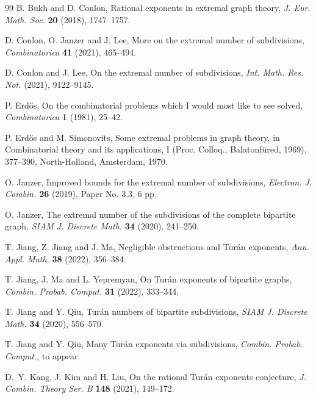 \documentclass[11pt]{article}
\numberwithin{equation}{section}
\theoremstyle{definition}
\begin{document}

\begin{thebibliography}{99}
B. Bukh and D. Conlon, Rational exponents in extremal graph theory, {\it J. Eur. Math. Soc.} {\bf 20} (2018), 1747--1757.

D. Conlon, O. Janzer and J. Lee, More on the extremal number of subdivisions, {\it Combinatorica} {\bf 41} (2021), 465--494.

D. Conlon and J. Lee, On the extremal number of subdivisions, {\it Int. Math. Res. Not.} (2021), 9122--9145.

P. Erd\H{o}s, On the combinatorial problems which I would most like to see solved, {\it Combinatorica} {\bf 1} (1981), 25--42.

P. Erd\H{o}s and M. Simonovits, Some extremal problems in graph theory, in Combinatorial theory and its applications, I (Proc. Colloq., Balatonf\"ured, 1969), 377--390, North-Holland, Amsterdam, 1970.


O. Janzer, Improved bounds for the extremal number of subdivisions, {\it Electron. J. Combin.} {\bf 26} (2019), Paper No. 3.3, 6 pp.

O. Janzer, The extremal number of the subdivisions of the complete bipartite graph, {\it SIAM J. Discrete Math.} {\bf 34} (2020), 241--250.

T. Jiang, Z. Jiang and J. Ma, Negligible obstructions and Tur\'an exponents, {\it Ann. Appl. Math.} {\bf 38} (2022), 356--384.

T. Jiang, J. Ma and L. Yepremyan, On Tur\'an exponents of bipartite graphs, {\it Combin. Probab. Comput.} {\bf 31} (2022), 333--344.

T. Jiang and Y. Qiu, Tur\'an numbers of bipartite subdivisions, {\it SIAM J. Discrete Math.} {\bf 34} (2020), 556--570.

T. Jiang and Y. Qiu, Many Tur\'an exponents via subdivisions, {\it Combin. Probab. Comput.}, to appear.

D.~Y. Kang, J. Kim and H. Liu, On the rational Tur\'an exponents conjecture, {\it J. Combin. Theory Ser. B} {\bf 148} (2021), 149--172.

\end{thebibliography}
\end{document}
